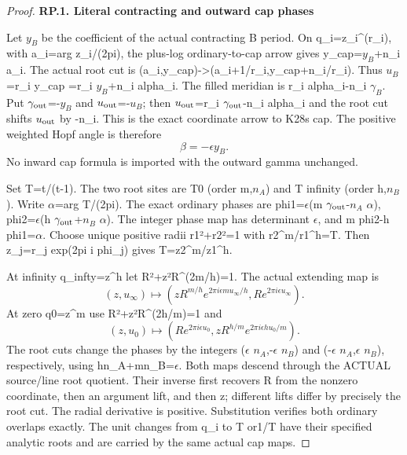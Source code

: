\begin{proof}
\par

\medskip\noindent\textbf{RP.1. Literal contracting and outward cap phases}

\par\nobreak

Let \(y_B\) be the coefficient of the actual contracting B period. On
q\_i=z\_i\^{}(r\_i), with a\_i=arg z\_i/(2pi), the plus-log ordinary-to-cap
arrow gives y\_cap=\(y_B\)+n\_i a\_i. The actual root cut is
(a\_i,y\_cap)-\textgreater(a\_i+1/r\_i,y\_cap+n\_i/r\_i). Thus \(u_B\)=r\_i y\_cap
=r\_i \(y_B\)+n\_i alpha\_i. The filled meridian is
r\_i alpha\_i-n\_i \(\gamma_B\). Put \(\gamma_{\rm out}\)=-\(y_B\) and \(u_{\rm out}\)=-\(u_B\);
then \(u_{\rm out}\)=r\_i \(\gamma_{\rm out}\)-n\_i alpha\_i and the root cut shifts
\(u_{\rm out}\) by -n\_i. This is the exact coordinate arrow to K28\textquotesingle s cap.
The positive weighted Hopf angle is therefore
\[
                              \beta=-\epsilon y_B.
\tag{RP.4}
\]
No inward cap formula is imported with the outward gamma unchanged.

Set T=t/(t-1). The two root sites are T0 (order m,\(n_A\)) and
T infinity (order h,\(n_B\)). Write \(\alpha\)=arg T/(2pi). The exact
ordinary phases are
phi1=\(\epsilon\)(m \(\gamma_{\rm out}\)-\(n_A\) \(\alpha\)),
phi2=\(\epsilon\)(h \(\gamma_{\rm out}\)+\(n_B\) \(\alpha\)).
The integer phase map has determinant \(\epsilon\), and m phi2-h phi1=\(\alpha\).
Choose unique positive radii r1²+r2²=1 with r2\^{}m/r1\^{}h=\textbar T\textbar.
Then z\_j=r\_j exp(2pi i phi\_j) gives T=z2\^{}m/z1\^{}h.

At infinity q\_infty=z\^{}h let R²+\textbar z\textbar²R\^{}(2m/h)=1. The actual
extending map is
\[
(z,u_\infty)\longmapsto
 (zR^{m/h}e^{2\pi i\epsilon m u_\infty/h},
                         R e^{2\pi i\epsilon u_\infty}).
\tag{RP.5}
\]
At zero q0=z\^{}m use R²+\textbar z\textbar²R\^{}(2h/m)=1 and
\[
(z,u_0)\longmapsto
 (R e^{2\pi i\epsilon u_0},
                  zR^{h/m}e^{2\pi i\epsilon h u_0/m}).
\tag{RP.6}
\]
The root cuts change the phases by the integers
(\(\epsilon\) \(n_A\),-\(\epsilon\) \(n_B\)) and (-\(\epsilon\) \(n_A\),\(\epsilon\) \(n_B\)),
respectively, using hn\_A+mn\_B=\(\epsilon\). Both maps descend through
the ACTUAL source/line root quotient. Their inverse first recovers R
from the nonzero coordinate, then an argument lift, and then z;
different lifts differ by precisely the root cut. The radial derivative
is positive. Substitution verifies both ordinary overlaps exactly.
The unit changes from q\_i to T or1/T have their specified analytic
roots and are carried by the same actual cap maps.


\end{proof}
